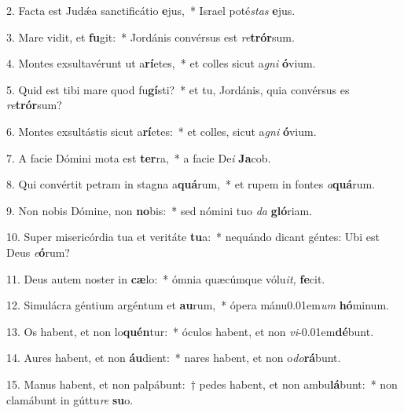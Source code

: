 \item 2. Facta est Judǽa sanctificátio \textbf{e}jus,~* Israel poté\hspace{0.03em}\textit{stas} \textbf{e}jus.

\item 3. Mare vidit, et \textbf{fu}git:~* Jordánis convérsus est \textit{re}\textbf{trór}sum.

\item 4. Montes exsultavérunt ut a\textbf{rí}etes,~* et colles sicut a\textit{gni} \textbf{ó}vium.

\item 5. Quid est tibi mare quod fu\textbf{gí}sti?~* et tu, Jordánis, quia convérsus es \textit{re}\textbf{trór}sum?

\item 6. Montes exsultástis sicut a\textbf{rí}etes:~* et colles, sicut a\textit{gni} \textbf{ó}vium.

\item 7. A facie Dómini mota est \textbf{ter}ra,~* a facie De\textit{i} \textbf{Ja}cob.

\item 8. Qui convértit petram in stagna a\textbf{quá}rum,~* et rupem in fontes \textit{a}\textbf{quá}rum.

\item 9. Non nobis Dómine, non \textbf{no}bis:~* sed nómini tuo \textit{da} \textbf{gló}riam.

\item 10. Super misericórdia tua et veritáte \textbf{tu}a:~* nequándo dicant géntes: Ubi est Deus \textit{e}\textbf{ó}rum?

\item 11. Deus autem noster in \textbf{cæ}lo:~* ómnia quæcúmque vólu\textit{it,} \textbf{fe}cit.

\item 12. Simulácra géntium argéntum et \textbf{au}rum,~* ópera mánu\kern 0.01em\textit{um} \textbf{hó}minum.

\item 13. Os habent, et non lo\textbf{quén}tur:~* óculos habent, et non \textit{vi}\kern -0.01em\textbf{dé}bunt.

\item 14. Aures habent, et non \textbf{áu}dient:~* nares habent, et non o\textit{do}\textbf{rá}bunt.

\item 15. Manus habent, et non palpábunt:~† pedes habent, et non ambu\textbf{lá}bunt:~* non clamábunt in gúttu\textit{re} \textbf{su}o.

